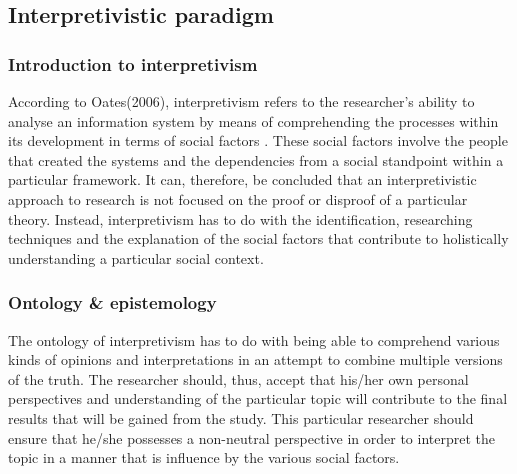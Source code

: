 \subsection{Interpretivistic paradigm}
\subsubsection{Introduction to interpretivism}
According to Oates(2006), interpretivism refers to the researcher’s ability to analyse an information system by means of comprehending the processes within its development in terms of social factors \cite{OatesJ2006}. These social factors involve the people that created the systems and the dependencies from a social standpoint within a particular framework.
It can, therefore, be concluded that an interpretivistic approach to research is not focused on the proof or disproof of a particular theory. Instead, interpretivism has to do with the identification, researching techniques and the explanation of the social factors that contribute to holistically understanding a particular social context.
\subsubsection{Ontology \& epistemology}
The ontology of interpretivism has to do with being able to comprehend various kinds of opinions and interpretations in an attempt to combine multiple versions of the truth. The researcher should, thus, accept that his/her own personal perspectives and understanding of the particular topic will contribute to the final results that will be gained from the study.  This particular researcher should ensure that he/she possesses a non-neutral perspective in order to interpret the topic in a manner that is influence by the various social factors.
